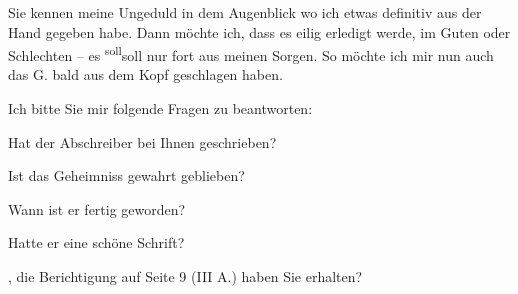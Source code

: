\pstart
           Sie kennen meine Ungeduld in dem Augenblick wo ich etwas definitiv aus der Hand
               gegeben habe. Dann möchte ich, dass es eilig erledigt werde, im Guten oder Schlechten
               – es \substVorne{}\textsuperscript{soll}\substDazwischen{}soll\substHinten{} nur fort aus meinen Sorgen. So möchte ich mir nun auch das G. bald aus dem Kopf geschlagen haben.\pend
           
\pstart
           Ich bitte Sie mir folgende Fragen zu beantworten:\pend
           
\pstart
           Hat der Abschreiber bei Ihnen
               geschrieben?\pend
           
\pstart
           Ist das Geheimniss gewahrt geblieben?\pend
           
\pstart
           Wann ist er fertig geworden?\pend
           
\pstart
           Hatte er eine schöne Schrift?\pend
           
\pstart
           \pend
           
\pstart
           \label{K_L03843-1v}\label{K_L03843-1}, die
               Berichtigung auf Seite 9 (III A.) haben Sie erhalten?\pend
           
